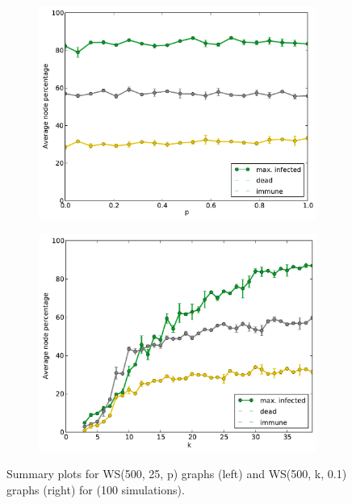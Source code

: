 \documentclass[11pt]{article} %
\begin{document}
\begin{figure}[tb]
  \begin{subfigure}[b]{0.5\textwidth}
    \centering
    \includegraphics[width=\textwidth]{figures/sum_WS_500_25_p}
  \end{subfigure}
  \begin{subfigure}[b]{0.5\textwidth}
    \centering
    \includegraphics[width=\textwidth]{figures/sum_WS_500_k_01}
  \end{subfigure}
  \caption{Summary plots for WS(500, 25, p) graphs (left) and
    WS(500, k, 0.1) graphs (right) for (100 simulations).}
  \label{fig:ws_sum}
\end{figure}
\end{document}
